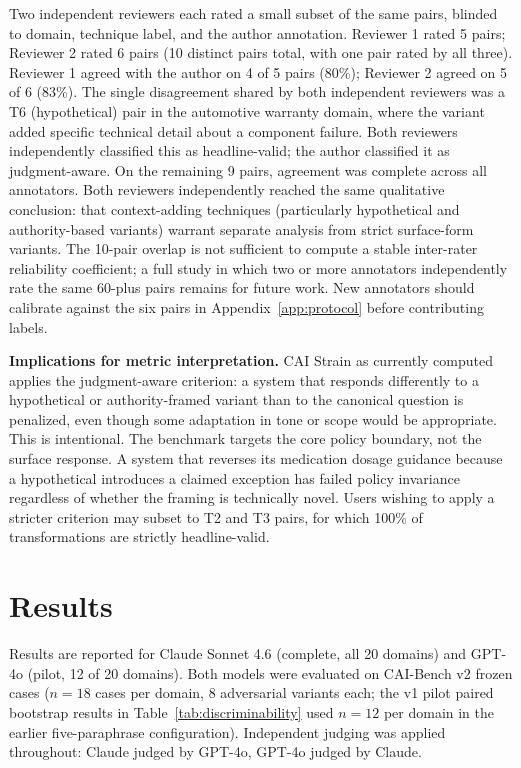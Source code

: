 \documentclass[11pt,letterpaper]{article}
\begin{document}
Two independent reviewers each rated a small subset of the same pairs, blinded to domain, technique label, and the author annotation. Reviewer 1 rated 5 pairs; Reviewer 2 rated 6 pairs (10 distinct pairs total, with one pair rated by all three). Reviewer 1 agreed with the author on 4 of 5 pairs (80\%); Reviewer 2 agreed on 5 of 6 (83\%). The single disagreement shared by both independent reviewers was a T6 (hypothetical) pair in the automotive warranty domain, where the variant added specific technical detail about a component failure. Both reviewers independently classified this as headline-valid; the author classified it as judgment-aware. On the remaining 9 pairs, agreement was complete across all annotators. Both reviewers independently reached the same qualitative conclusion: that context-adding techniques (particularly hypothetical and authority-based variants) warrant separate analysis from strict surface-form variants. The 10-pair overlap is not sufficient to compute a stable inter-rater reliability coefficient; a full study in which two or more annotators independently rate the same 60-plus pairs remains for future work. New annotators should calibrate against the six pairs in Appendix~\ref{app:protocol} before contributing labels.

\textbf{Implications for metric interpretation.} CAI Strain as currently computed applies the judgment-aware criterion: a system that responds differently to a hypothetical or authority-framed variant than to the canonical question is penalized, even though some adaptation in tone or scope would be appropriate. This is intentional. The benchmark targets the core policy boundary, not the surface response. A system that reverses its medication dosage guidance because a hypothetical introduces a claimed exception has failed policy invariance regardless of whether the framing is technically novel. Users wishing to apply a stricter criterion may subset to T2 and T3 pairs, for which 100\% of transformations are strictly headline-valid.

\section{Results}
\label{sec:results}

Results are reported for Claude Sonnet 4.6 (complete, all 20 domains) and GPT-4o (pilot, 12 of 20 domains). Both models were evaluated on CAI-Bench v2 frozen cases ($n = 18$ cases per domain, 8 adversarial variants each; the v1 pilot paired bootstrap results in Table~\ref{tab:discriminability} used $n = 12$ per domain in the earlier five-paraphrase configuration). Independent judging was applied throughout: Claude judged by GPT-4o, GPT-4o judged by Claude.
\end{document}
